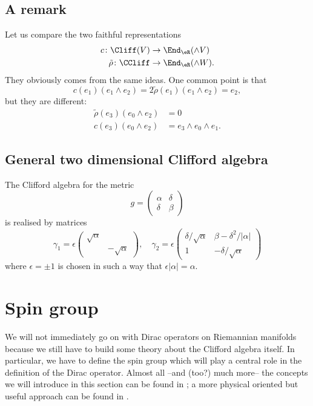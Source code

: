 \subsection{A remark}  %

 Let us compare the two faithful representations
\[
\begin{split}
  c\colon \Cliff(V)&\to \End_{\eR}(\wedge V)\\
\tilde\rho\colon \CCliff&\to  \End_{\eR}(\wedge W).
\end{split}
\]
They obviously comes from the same ideas. One common point is that
\[
  c(e_1)(e_1\wedge e_2)=2\tilde\rho (e_1)(e_1\wedge e_2)=e_2,
\]
but they are different:
\[
\begin{split}
  \tilde\rho(e_3)(e_0\wedge e_2)&=0\\
c(e_3)(e_0\wedge e_2)&=e_3\wedge e_0\wedge e_1.
\end{split}
\]

\subsection{General two dimensional Clifford algebra}

The Clifford algebra for the metric
\[
  g=\begin{pmatrix}
\alpha&\delta\\\delta&\beta
\end{pmatrix}
\]
is realised by matrices
\[
  \gamma_1=
\epsilon\begin{pmatrix}
\sqrt{\alpha}\\ & -\sqrt{\alpha}
\end{pmatrix},\quad
\gamma_2=
\epsilon\begin{pmatrix}
\delta/\sqrt{\alpha}& \beta-\delta^2/| \alpha |\\
1		& -\delta/\sqrt{\alpha}
\end{pmatrix}
\]
where $\epsilon=\pm 1$ is chosen in such a way that $\epsilon| \alpha |=\alpha$.

\section{Spin group}

We will not immediately go on with Dirac operators on Riemannian manifolds because we still have to build some theory about the Clifford algebra itself. In particular, we have to define the spin group which will play a central role in the definition of the Dirac operator. Almost all --and (too?) much more-- the concepts we will introduce in this section can be found in \cite{Chevalley}; a more physical oriented but useful approach can be found in \cite{Preparation}.

